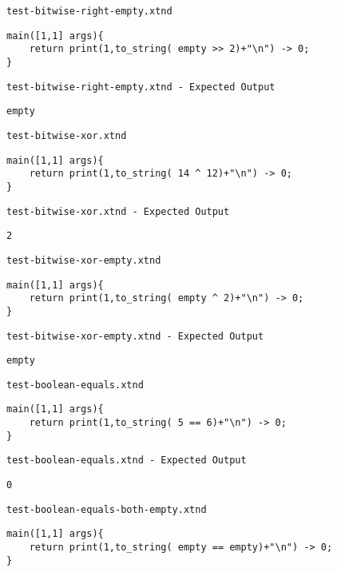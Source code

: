 \medskip \noindent \texttt{test-bitwise-right-empty.xtnd}


\begin{lstlisting}
main([1,1] args){
	return print(1,to_string( empty >> 2)+"\n") -> 0;
}
\end{lstlisting}


\medskip \noindent \texttt{test-bitwise-right-empty.xtnd - Expected Output}


\begin{lstlisting}
empty
\end{lstlisting}


\medskip \noindent \texttt{test-bitwise-xor.xtnd}


\begin{lstlisting}
main([1,1] args){
	return print(1,to_string( 14 ^ 12)+"\n") -> 0;
}
\end{lstlisting}


\medskip \noindent \texttt{test-bitwise-xor.xtnd - Expected Output}


\begin{lstlisting}
2
\end{lstlisting}


\medskip \noindent \texttt{test-bitwise-xor-empty.xtnd}


\begin{lstlisting}
main([1,1] args){
	return print(1,to_string( empty ^ 2)+"\n") -> 0;
}
\end{lstlisting}


\medskip \noindent \texttt{test-bitwise-xor-empty.xtnd - Expected Output}


\begin{lstlisting}
empty
\end{lstlisting}


\medskip \noindent \texttt{test-boolean-equals.xtnd}


\begin{lstlisting}
main([1,1] args){
	return print(1,to_string( 5 == 6)+"\n") -> 0;
}
\end{lstlisting}


\medskip \noindent \texttt{test-boolean-equals.xtnd - Expected Output}


\begin{lstlisting}
0
\end{lstlisting}


\medskip \noindent \texttt{test-boolean-equals-both-empty.xtnd}


\begin{lstlisting}
main([1,1] args){
	return print(1,to_string( empty == empty)+"\n") -> 0;
}
\end{lstlisting}


